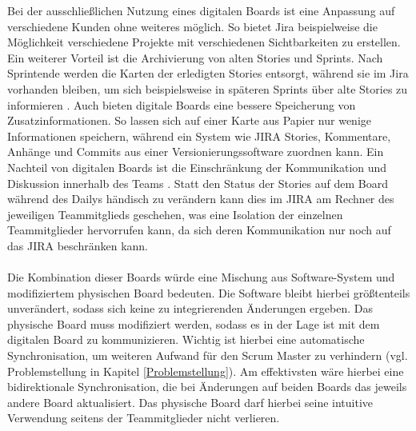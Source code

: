 \documentclass[12pt,titlepage]{scrartcl}
\begin{document}
		Bei der ausschließlichen Nutzung eines digitalen Boards ist eine Anpassung auf verschiedene Kunden ohne weiteres möglich. So bietet Jira beispielweise die Möglichkeit verschiedene Projekte mit verschiedenen Sichtbarkeiten zu erstellen. Ein weiterer Vorteil ist die Archivierung von alten Stories und Sprints. Nach Sprintende werden die Karten der erledigten Stories entsorgt, während sie im Jira vorhanden bleiben, um sich beispielsweise in späteren Sprints über alte Stories zu informieren \cite{softtools}. Auch bieten digitale Boards eine bessere Speicherung von Zusatzinformationen. So lassen sich auf einer Karte aus Papier nur wenige Informationen speichern, während ein System wie JIRA Stories, Kommentare, Anhänge und Commits aus einer Versionierungssoftware zuordnen kann. Ein Nachteil von digitalen Boards ist die Einschränkung der Kommunikation und Diskussion innerhalb des Teams \cite{drift}. Statt den Status der Stories auf dem Board während des Dailys händisch zu verändern kann dies im JIRA am Rechner des jeweiligen Teammitglieds geschehen, was eine Isolation der einzelnen Teammitglieder hervorrufen kann, da sich deren Kommunikation nur noch auf das JIRA beschränken kann. \\ \\
		Die Kombination dieser Boards würde eine Mischung aus Software-System und modifiziertem physischen Board bedeuten. Die Software bleibt hierbei größtenteils unverändert, sodass sich keine zu integrierenden Änderungen ergeben. Das physische Board muss modifiziert werden, sodass es in der Lage ist mit dem digitalen Board zu kommunizieren. Wichtig ist hierbei eine automatische Synchronisation, um weiteren Aufwand für den Scrum Master zu verhindern (vgl. Problemstellung in Kapitel \ref{Problemstellung}). Am effektivsten wäre hierbei eine bidirektionale Synchronisation, die bei Änderungen auf beiden Boards das jeweils andere Board aktualisiert. Das physische Board darf hierbei seine intuitive Verwendung seitens der Teammitglieder nicht verlieren.
\end{document}
